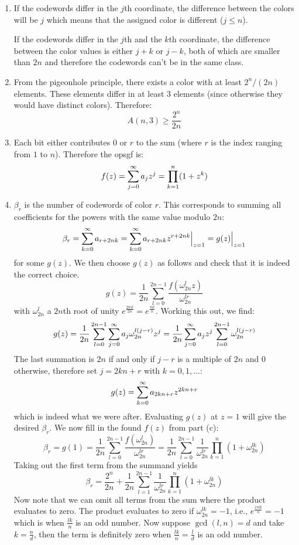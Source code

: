 \begin{solution}
    \begin{enumerate}[label=(\alph*)]
        \item If the codewords differ in the $j$th coordinate, the difference between the colors will be $j$ which means that the assigned color is different ($j \leq n$). 
        
        If the codewords differ in the $j$th and the $k$th coordinate, the difference between the color values is either $j+k$ or $j-k$, both of which are smaller than $2n$ and therefore the codewords can't be in the same class.
        \item From the pigeonhole principle, there exists a color with at least $2^n/(2n)$ elements. These elements differ in at least $3$ elements (since otherwise they would have distinct colors). Therefore:
        \[
            A(n,3) \geq \frac{2^n}{2n}  
        \]
        \item Each bit either contributes $0$ or $r$ to the sum (where $r$ is the index ranging from $1$ to $n$). Therefore the opsgf is:
        \[
            f(z) = \bsum[j] a_j z^j = \prod_{k=1}^n (1 + z^k)
        \]
        \item $\beta_r$ is the number of codewords of color $r$. This corresponds to summing all coefficients for the powers with the same value modulo $2n$:
        \[
            \beta_r = \bsum[k] a_{r+2nk} = \bsum[k] a_{r+2nk}z^{r+2nk} \Bigr\vert_{z=1} = g(z) \Bigr\vert_{z=1}
        \]
        for some $g(z)$. We then choose $g(z)$ as follows and check that it is indeed the correct choice.
        \[
            g(z) = \frac{1}{2n} \sum_{l=0}^{2n-1} \frac{f(\omega_{2n}^lz)}{\omega_{2n}^{lr}}
        \]
        with $\omega_{2n}^l$ a $2n$th root of unity $e^{\frac{2\pi il}{2n}} = e^{\frac{\pi il}{n}}$. Working this out, we find:
        \[
            g(z) = \frac{1}{2n} \sum_{l=0}^{2n-1} \bsum[j] a_j \omega_{2n}^{l(j-r)}z^{j} = \frac{1}{2n} \bsum[j] a_jz^{j} \sum_{l=0}^{2n-1} \omega_{2n}^{l(j-r)}
        \]
        The last summation is $2n$ if and only if $j-r$ is a multiple of $2n$ and $0$ otherwise, therefore set $j = 2kn +r$ with $k=0,1,\ldots$:
        \[
            g(z) = \bsum[k] a_{2kn+r}z^{2kn+r}
        \]
        which is indeed what we were after. Evaluating $g(z)$ at $z=1$ will give the desired $\beta_r$. We now fill in the found $f(z)$ from part (c):
        \[
            \beta_r = g(1) = \frac{1}{2n} \sum_{l=0}^{2n-1} \frac{f(\omega_{2n}^l)}{\omega_{2n}^{lr}} = \frac{1}{2n} \sum_{l=0}^{2n-1} \frac{1}{\omega_{2n}^{lr}} \prod_{k=1}^n (1 + \omega_{2n}^{lk})
        \]
        Taking out the first term from the summand yields
        \[
            \beta_r = \frac{2^n}{2n} + \frac{1}{2n}\sum_{l=1}^{2n-1} \frac{1}{\omega_{2n}^{lr}} \prod_{k=1}^n (1+\omega_{2n}^{lk})
        \]
        Now note that we can omit all terms from the sum where the product evaluates to zero. The product evaluates to zero if $\omega_{2n}^{lk} = -1$, i.e., $e^{\frac{i\pi l k}{n}} = -1$ which is when $\frac{lk}{n}$ is an odd number. Now suppose $\gcd(l,n) = d$ and take $k = \frac{n}{d}$, then the term is definitely zero when $\frac{lk}{n} = \frac{l}{d}$ is an odd number.
        

\end{enumerate}
\end{solution}
